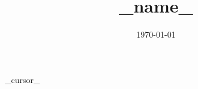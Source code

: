 \documentclass[a4paper]{article}
\title{{{_name_}}}
\author{}
\date{\today}
\begin{document}
\maketitle

{{_cursor_}}
\end{document}
